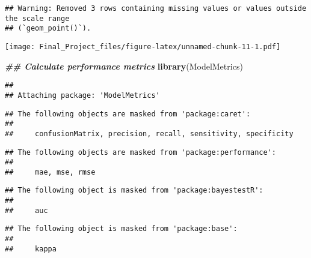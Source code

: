 \documentclass[
]{article}
\newenvironment{Shaded}{\begin{snugshade}}{\end{snugshade}}
\newcommand{\DecValTok}[1]{\textcolor[rgb]{0.00,0.00,0.81}{#1}}
\newcommand{\DocumentationTok}[1]{\textcolor[rgb]{0.56,0.35,0.01}{\textbf{\textit{#1}}}}
\newcommand{\FunctionTok}[1]{\textcolor[rgb]{0.13,0.29,0.53}{\textbf{#1}}}
\newcommand{\NormalTok}[1]{#1}
\newcommand{\OtherTok}[1]{\textcolor[rgb]{0.56,0.35,0.01}{#1}}
\newcommand{\SpecialCharTok}[1]{\textcolor[rgb]{0.81,0.36,0.00}{\textbf{#1}}}
\newcommand{\StringTok}[1]{\textcolor[rgb]{0.31,0.60,0.02}{#1}}
\begin{document}
\begin{verbatim}
## Warning: Removed 3 rows containing missing values or values outside the scale range
## (`geom_point()`).
\end{verbatim}

\texttt{[image: Final\_Project\_files/figure-latex/unnamed-chunk-11-1.pdf]}

\begin{Shaded}
\begin{Highlighting}[]
\DocumentationTok{\#\# Calculate performance metrics}
\FunctionTok{library}\NormalTok{(ModelMetrics)}
\end{Highlighting}
\end{Shaded}

\begin{verbatim}
## 
## Attaching package: 'ModelMetrics'
\end{verbatim}

\begin{verbatim}
## The following objects are masked from 'package:caret':
## 
##     confusionMatrix, precision, recall, sensitivity, specificity
\end{verbatim}

\begin{verbatim}
## The following objects are masked from 'package:performance':
## 
##     mae, mse, rmse
\end{verbatim}

\begin{verbatim}
## The following object is masked from 'package:bayestestR':
## 
##     auc
\end{verbatim}

\begin{verbatim}
## The following object is masked from 'package:base':
## 
##     kappa
\end{verbatim}

\begin{Shaded}
\end{Shaded}
\end{document}
